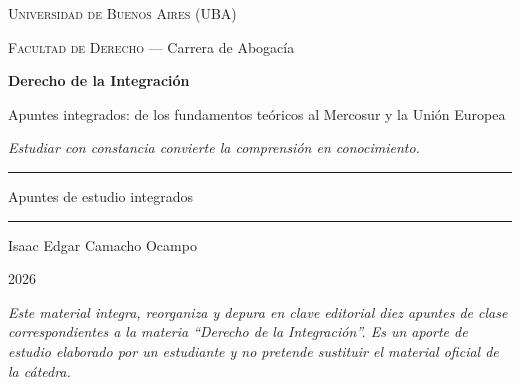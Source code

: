 \documentclass[12pt,oneside]{book}
\newcommand{\universidad}{Universidad de Buenos Aires (UBA)}
\newcommand{\facultad}{Facultad de Derecho}
\newcommand{\carrera}{Carrera de Abogacía}
\newcommand{\materia}{Derecho de la Integración}
\newcommand{\titulo}{Derecho de la Integración}
\newcommand{\subtitulo}{Apuntes integrados: de los fundamentos teóricos al Mercosur y la Unión Europea}
\newcommand{\autor}{Isaac Edgar Camacho Ocampo}
\newcommand{\anio}{2026}
\begin{document}

\frontmatter

\begin{titlepage}
\thispagestyle{empty}
\begin{center}

\vspace*{1cm}
{\large \textsc{\universidad}}

\vspace{0.2cm}
{\large \textsc{\facultad} --- \carrera}

\vspace{3cm}
{\Huge \textbf{\titulo}}

\vspace{1cm}
{\LARGE \subtitulo}

\vspace{0.8cm}
\textit{Estudiar con constancia convierte la comprensión en conocimiento.}

\vspace{1.2cm}
\rule{0.70\textwidth}{0.5pt}

\vspace{0.5cm}
{\large Apuntes de estudio integrados}

\vspace{0.5cm}
\rule{0.70\textwidth}{0.5pt}

\vfill
{\large \autor}

\vspace{0.3cm}
{\large \anio}

\end{center}

\vfill
\begin{flushleft}
\textit{Este material integra, reorganiza y depura en clave editorial diez apuntes de clase correspondientes a la materia ``\materia''. Es un aporte de estudio elaborado por un estudiante y no pretende sustituir el material oficial de la cátedra.}
\end{flushleft}
\end{titlepage}

\tableofcontents

\end{document}
